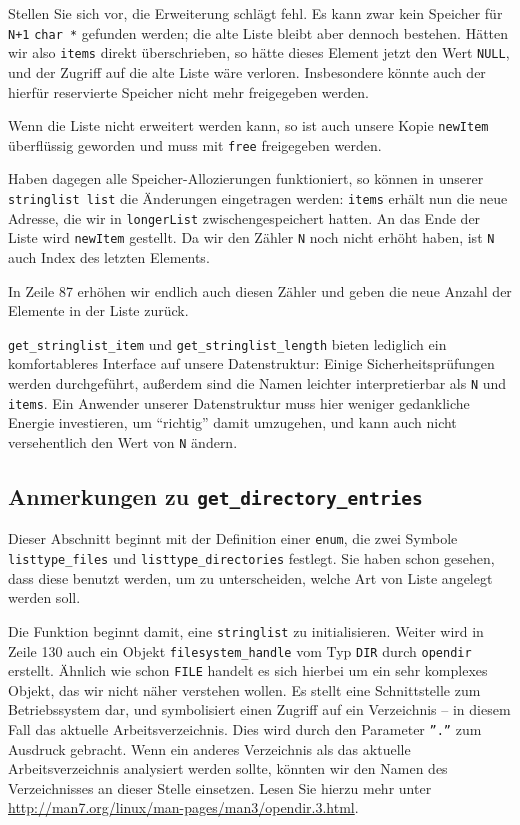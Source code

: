 Stellen Sie sich vor, die Erweiterung schlägt fehl. Es kann zwar kein Speicher für \texttt{N+1} \texttt{char *} gefunden werden; die alte Liste bleibt aber dennoch bestehen. Hätten wir also \texttt{items} direkt überschrieben, so hätte dieses Element jetzt den Wert \texttt{NULL}, und der Zugriff auf die alte Liste wäre verloren. Insbesondere könnte auch der hierfür reservierte Speicher nicht mehr freigegeben werden. 

Wenn die Liste nicht erweitert werden kann, so ist auch unsere Kopie \texttt{newItem} überflüssig geworden und muss mit \texttt{free} freigegeben werden.

Haben dagegen alle Speicher-Allozierungen funktioniert, so können in unserer \texttt{stringlist list} die Änderungen eingetragen werden: \texttt{items} erhält nun die neue Adresse, die wir in \texttt{longerList} zwischengespeichert hatten. An das Ende der Liste wird \texttt{newItem} gestellt. Da wir den Zähler \texttt{N} noch nicht erhöht haben, ist \texttt{N} auch Index des letzten Elements.

In Zeile 87 erhöhen wir endlich auch diesen Zähler und geben die neue Anzahl der Elemente in der Liste zurück.

\texttt{get\_stringlist\_item} und \texttt{get\_stringlist\_length} bieten lediglich ein komfortableres Interface auf unsere Datenstruktur: Einige Sicherheitsprüfungen werden durchgeführt, außerdem sind die Namen leichter interpretierbar als \texttt{N} und \texttt{items}. Ein Anwender unserer Datenstruktur muss hier weniger gedankliche Energie investieren, um \enquote{richtig} damit umzugehen, und kann auch nicht versehentlich den Wert von \texttt{N} ändern.

\subsection{Anmerkungen zu \texttt{get\_directory\_entries}}
Dieser Abschnitt beginnt mit der Definition einer \texttt{enum}, die zwei Symbole \texttt{listtype\_files} und \texttt{listtype\_directories} festlegt. Sie haben schon gesehen, dass diese benutzt werden, um zu unterscheiden, welche Art von Liste angelegt werden soll.

Die Funktion beginnt damit, eine \texttt{stringlist} zu initialisieren. Weiter wird in Zeile 130 auch ein Objekt \texttt{filesystem\_handle} vom Typ \texttt{DIR} durch \texttt{opendir} erstellt. Ähnlich wie schon \texttt{FILE} handelt es sich hierbei um ein sehr komplexes Objekt, das wir nicht näher verstehen wollen. Es stellt eine Schnittstelle zum Betriebssystem dar, und symbolisiert einen Zugriff auf ein Verzeichnis -- in diesem Fall das aktuelle Arbeitsverzeichnis. Dies wird durch den Parameter \texttt{''.''} zum Ausdruck gebracht. Wenn ein anderes Verzeichnis als das aktuelle Arbeitsverzeichnis analysiert werden sollte, könnten wir den Namen des Verzeichnisses an dieser Stelle einsetzen. Lesen Sie hierzu mehr unter \url{http://man7.org/linux/man-pages/man3/opendir.3.html}.

